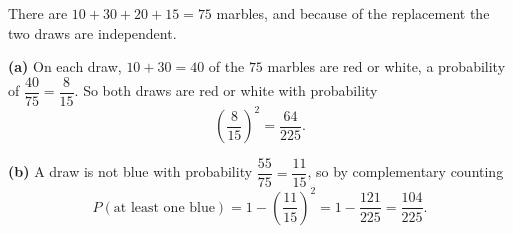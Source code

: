 There are $10+30+20+15=75$ marbles, and because of the replacement the two draws are independent.

\textbf{(a)} On each draw, $10+30=40$ of the $75$ marbles are red or white, a probability of $\dfrac{40}{75}=\dfrac{8}{15}$. So both draws are red or white with probability
\[\left(\dfrac{8}{15}\right)^2=\boxed{\dfrac{64}{225}}.\]

\textbf{(b)} A draw is not blue with probability $\dfrac{55}{75}=\dfrac{11}{15}$, so by complementary counting
\[P(\text{at least one blue})=1-\left(\dfrac{11}{15}\right)^2=1-\dfrac{121}{225}=\boxed{\dfrac{104}{225}}.\]
